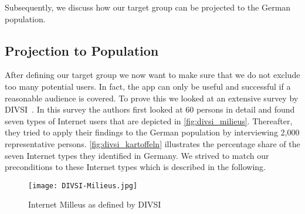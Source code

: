 Subsequently, we discuss how our target group can be projected to the German population.

\subsection{Projection to Population}
After defining our target group we now want to make sure that we do not exclude too many potential users.
In fact, the app can only be useful and successful if a reasonable audience is covered.
To prove this we looked at an extensive survey by DIVSI~\cite{divsi2012divsi}.
In this survey the authors first looked at 60 persons in detail and found seven types of Internet users that are depicted in \autoref{fig:divsi_milieus}.
Thereafter, they tried to apply their findings to the German population by interviewing 2,000 representative persons.
\autoref{fig:divsi_kartoffeln} illustrates the percentage share of the seven Internet types they identified in Germany.
We strived to match our preconditions to these Internet types which is described in the following.

\begin{figure}[hHtbp]
\centering
\texttt{[image: DIVSI-Milieus.jpg]}
\caption{Internet Milleus as defined by DIVSI \cite{divsi2012divsi}}
\label{fig:divsi_milieus}
\end{figure}

